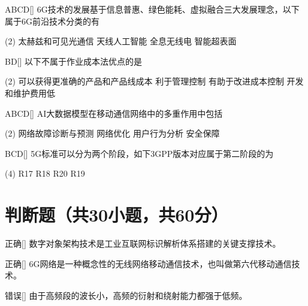 \begin{choice}{\;ABCD\;}[]
    6G技术的发展基于信息普惠、绿色能耗、虚拟融合三大发展理念，以下属于6G前沿技术分类的有
    \begin{tasks}(2)
        \task 太赫兹和可见光通信
        \task 天线人工智能
        \task 全息无线电
        \task 智能超表面
    \end{tasks}
\end{choice}


\begin{choice}{\;BD\;}[]
    以下不属于作业成本法优点的是
    \begin{tasks}(2)
        \task 可以获得更准确的产品和产品线成本
        \task 利于管理控制
        \task 有助于改进成本控制
        \task 开发和维护费用低
    \end{tasks}
\end{choice}


\begin{choice}{\;ABCD\;}[]
    AI大数据模型在移动通信网络中的多重作用中包括
    \begin{tasks}(2)
        \task 网络故障诊断与预测
        \task 网络优化
        \task 用户行为分析
        \task 安全保障
    \end{tasks}
\end{choice}


\begin{choice}{\;BCD\;}[]
    5G标准可以分为两个阶段，如下3GPP版本对应属于第二阶段的为
    \begin{tasks}(4)
        \task R17
        \task R18
        \task R20
        \task R19
    \end{tasks}
\end{choice}


\section{判断题（共30小题，共60分）}

\begin{choice}{\;正确\;}[]
    数字对象架构技术是工业互联网标识解析体系搭建的关键支撑技术。
\end{choice}


\begin{choice}{\;正确\;}[]
    6G网络是一种概念性的无线网络移动通信技术，也叫做第六代移动通信技术。
\end{choice}

\begin{choice}{\;错误\;}[]
    由于高频段的波长小，高频的衍射和绕射能力都强于低频。
\end{choice}

